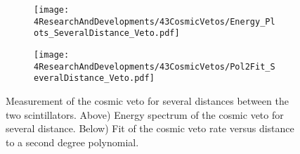 \begin{figure}
\centering
    \begin{subfigure}[b]{0.85\textwidth}
    \centering
    \texttt{[image: 4ResearchAndDevelopments/43CosmicVetos/Energy\_Plots\_SeveralDistance\_Veto.pdf]}  
    \caption{\label{subfig:EnergySpectrumsSeveralDistanceVeto}}
    \end{subfigure}
    \hfill
    \begin{subfigure}[b]{0.85\textwidth}
    \centering
    \texttt{[image: 4ResearchAndDevelopments/43CosmicVetos/Pol2Fit\_SeveralDistance\_Veto.pdf]}  
    \caption{\label{subfig:LinearFitSeveralDistanceVeto}}
    \end{subfigure}
 \caption{Measurement of the cosmic veto for several distances between the two scintillators. Above) Energy spectrum of the cosmic veto for several distance. Below) Fit of the cosmic veto rate versus distance to a second degree polynomial.}
 \label{fig:DistanceVeto}
\end{figure}

